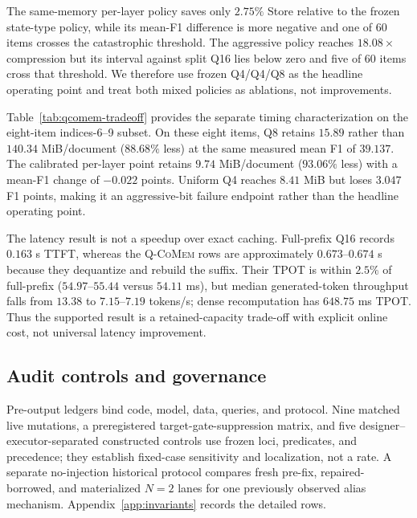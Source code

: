 \documentclass{article}
\newcommand{\qcomem}{\textsc{Q-CoMem}}
\begin{document}
The same-memory per-layer policy saves only $2.75\%$ Store relative to the
frozen state-type policy, while its mean-F1 difference is more negative and
one of 60 items crosses the catastrophic threshold.  The aggressive policy
reaches $18.08\times$ compression but its interval against split Q16 lies below
zero and five of 60 items cross that threshold.  We therefore use frozen
Q4/Q4/Q8 as the headline operating point and treat both mixed policies as
ablations, not improvements.



Table~\ref{tab:qcomem-tradeoff} provides the separate timing characterization
on the eight-item indices-6--9 subset.
On these eight items, Q8 retains $15.89$ rather than $140.34$ MiB/document
($88.68\%$ less) at the same measured mean F1 of $39.137$.  The calibrated
per-layer point retains $9.74$ MiB/document ($93.06\%$ less) with a mean-F1
change of $-0.022$ points.  Uniform Q4 reaches $8.41$ MiB but loses $3.047$ F1
points, making it an aggressive-bit failure endpoint rather than the headline
operating point.

The latency result is not a speedup over exact caching.  Full-prefix Q16 records
$0.163$ s TTFT, whereas the \qcomem{} rows are approximately $0.673$--$0.674$
s because they dequantize and rebuild the suffix.  Their TPOT is within $2.5\%$
of full-prefix ($54.97$--$55.44$ versus $54.11$ ms), but median generated-token
throughput falls from $13.38$ to $7.15$--$7.19$ tokens/s; dense recomputation
has $648.75$ ms TPOT.  Thus the supported result is a retained-capacity
trade-off with explicit online cost, not universal latency improvement.



\subsection{Audit controls and governance}

Pre-output ledgers bind code, model, data, queries, and protocol.  Nine matched
live mutations, a preregistered target-gate-suppression matrix, and five
designer--executor-separated constructed controls use frozen loci, predicates,
and precedence; they establish fixed-case sensitivity and localization, not a
rate.  A separate no-injection historical protocol compares fresh pre-fix,
repaired-borrowed, and materialized $N=2$ lanes for one previously observed
alias mechanism.  Appendix~\ref{app:invariants} records the detailed rows.
\end{document}
